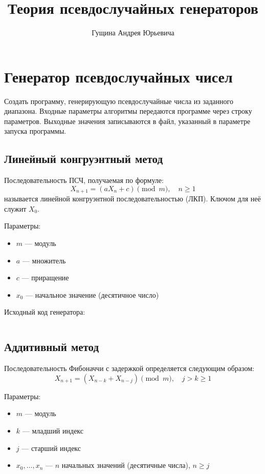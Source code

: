 \documentclass[spec, och, pract_otchet]{SCWorks}
\title{Теория псевдослучайных генераторов}
\author{Гущина Андрея Юрьевича} %
\begin{document}

\tableofcontents

\section{Генератор псевдослучайных чисел}

Создать программу, генерирующую псевдослучайные числа из заданного диапазона.
Входные параметры алгоритмы передаются программе через строку параметров.
Выходные значения записываются в файл, указанный в параметре запуска программы.

\subsection{Линейный конгруэнтный метод}

Последовательность ПСЧ, получаемая по формуле:
\begin{equation*}
  X_{n + 1} = (a X_n + c) \pmod{m},\quad n \geq 1
\end{equation*}
называется линейной конгруэнтной последовательностью (ЛКП). Ключом для неё
служит $X_0$.

Параметры:
\begin{itemize}
  \item $m$  --- модуль
  \item $a$  --- множитель
  \item $c$  --- приращение
  \item $x_0$ --- начальное значение (десятичное число)
\end{itemize}

Исходный код генератора:
\inputminted{rust}{../prng/src/linear.rs}

\subsection{Аддитивный метод}

Последовательность Фибоначчи с задержкой определяется следующим образом:
\begin{equation*}
  X_{n + 1} = (X_{n - k} + X_{n - j}) \pmod{m},\quad j > k \geq 1
\end{equation*}

Параметры:
\begin{itemize}
  \item $m$ --- модуль
  \item $k$ --- младший индекс
  \item $j$ --- старший индекс
  \item $x_0,\dots,x_n$ --- $n$ начальных значений (десятичные числа), $n \geq j$
\end{itemize}
\end{document}
